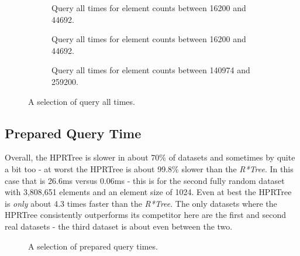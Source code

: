 \begin{figure}[H]
    \centering
    \begin{subfigure}{0.458\textwidth}
        
        \caption[Query all times for element counts between 16200 and 44692.]{Query all times for element counts between 16200 and 44692.}
        \label{sfig:qalla}
    \end{subfigure}\hfill
    \begin{subfigure}{0.458\textwidth}
        
        \caption[Query all times for element counts between 16200 and 44692.]{Query all times for element counts between 16200 and 44692.}
        \label{sfig:qallb}
    \end{subfigure}\hfill
    \begin{subfigure}{0.458\textwidth}
        
        \caption[Query all times for element counts between 140974 and 259200.]{Query all times for element counts between 140974 and 259200.}
        \label{sfig:qallc}
    \end{subfigure}
    \caption[A selection of query all times.]{A selection of query all times.}
    \label{fig:qall}
\end{figure}

\subsection{Prepared Query Time}

Overall, the \acs{HPRTree} is slower in about 70\% of datasets and sometimes by quite a bit too - at worst the \acs{HPRTree} is about 99.8\% slower than the \textit{R*Tree}. In this case that is 26.6ms versus 0.06ms - this is for the second fully random dataset with 3,808,651 elements and an element size of 1024. Even at best the \acs{HPRTree} is \textit{only} about 4.3 times faster than the \textit{R*Tree}. The only datasets where the \acs{HPRTree} consistently outperforms its competitor here are the first\cite{simplemaps} and second\cite{opendata} real datasets - the third dataset is about even between the two.

\begin{figure}[H]
    \centering
    \begin{subfigure}{0.458\textwidth}
        
        \caption[]{}
        \label{sfig:qprea}
    \end{subfigure}\hfill
    \begin{subfigure}{0.458\textwidth}
        
        \caption[]{}
        \label{sfig:qpreb}
    \end{subfigure}\hfill
    \begin{subfigure}{0.458\textwidth}
        
        \caption[]{}
        \label{sfig:qprec}
    \end{subfigure}
    \caption[A selection of prepared query times.]{A selection of prepared query times.}
    \label{fig:qpre}
\end{figure}